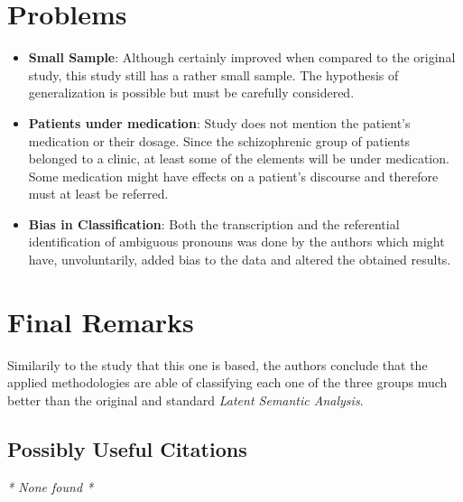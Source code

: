 \documentclass{Paper_Summary}
\begin{document}
\section{Problems}
    \begin{itemize}
        \item \textbf{Small Sample}: Although certainly improved when compared to the original study, this study still has a rather small sample. The hypothesis of generalization is possible but must be carefully considered.
        \item \textbf{Patients under medication}: Study does not mention the patient's medication or their dosage. Since the schizophrenic group of patients belonged to a clinic, at least some of the elements will be under medication. Some medication might have effects on a patient's discourse and therefore must at least be referred.
        \item \textbf{Bias in Classification}: Both the transcription and the referential identification of ambiguous pronouns was done by the authors which might have, unvoluntarily, added bias to the data and altered the obtained results.
        
    \end{itemize}


\section{Final Remarks}

    Similarily to the study that this one is based, the authors conclude that the applied methodologies are able of classifying each one of the three groups much better than the original and standard \emph{Latent Semantic Analysis}.

\breakline

\begin{center}
    \section*{Possibly Useful Citations}
\end{center}
\emph{* None found *}
\end{document}
